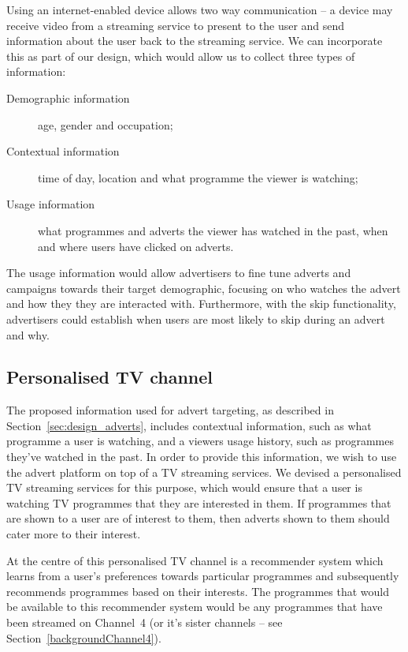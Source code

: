 	Using an internet-enabled device allows two way communication -- a device may receive video from a streaming service to present to the user and send information about the user back to the streaming service. We can incorporate this as part of our design, which would allow us to collect three types of information:
	\begin{description}
	\item[Demographic information] age, gender and occupation;
	\item[Contextual information] time of day, location and what programme the viewer is watching;
	\item[Usage information] what programmes and adverts the viewer has watched in the past, when and where users have clicked on adverts.
	\end{description}

	The usage information would allow advertisers to fine tune adverts and campaigns towards their target demographic, focusing on who watches the advert and how they they are interacted with. Furthermore, with the skip functionality, advertisers could establish when users are most likely to skip during an advert and why.

\subsection{Personalised TV channel}

	The proposed information used for advert targeting, as described in Section~\ref{sec:design_adverts}, includes contextual information, such as what programme a user is watching, and a viewers usage history, such as programmes they've watched in the past. In order to provide this information, we wish to use the advert platform on top of a TV streaming services. We devised a personalised TV streaming services for this purpose, which would ensure that a user is watching TV programmes that they are interested in them. If programmes that are shown to a user are of interest to them, then adverts shown to them should cater more to their interest.

	At the centre of this personalised TV channel is a recommender system which learns from a user's preferences towards particular programmes and subsequently recommends programmes based on their interests. The programmes that would be available to this recommender system would be any programmes that have been streamed on Channel~4 (or it's sister channels -- see Section~\ref{backgroundChannel4}).

